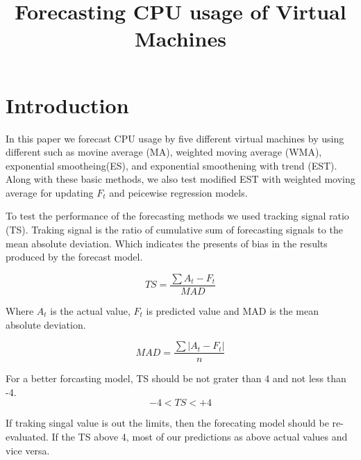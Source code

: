 \documentclass[conference,onecolumn]{IEEEtran}
\begin{document}
\title{Forecasting CPU usage of Virtual Machines}
\author{
}

\maketitle

\IEEEpeerreviewmaketitle



\section{Introduction}
In this paper we forecast CPU usage by five different virtual machines by using different such as movine average (MA), weighted moving average (WMA), exponential smootheing(ES), and exponential smoothening with trend (EST). Along with these basic methods, we also test modified EST with weighted moving average for updating $F_t$ and peicewise regression models.

To test the performance of the forecasting methods we used tracking signal ratio (TS). Traking signal is the ratio of cumulative sum of forecasting signals to the mean absolute deviation. Which indicates the presents of bias in the results produced by the forecast model.

\begin{equation}
TS = \frac{\sum A_t - F_t}{MAD}
\end{equation}

Where $A_t$ is the actual value, $F_t$ is predicted value and MAD is the mean absolute deviation.

\begin{equation}
MAD = \frac{\sum |A_t - F_t|}{n}
\end{equation}

For a better forcasting model, TS should be not grater than 4 and not less than -4.
\begin{equation}
-4 < TS < +4 
\end{equation}

If traking singal value is out the limits, then the forecating model should be re-evaluated. If the TS above 4, most of our predictions as above actual values and vice versa.
\end{document}

